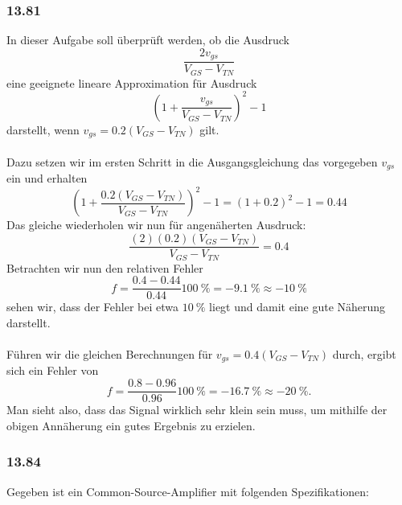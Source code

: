 \documentclass[11pt,a4paper,titlepage]{article}
\begin{document}
\subsubsection*{13.81}
In dieser Aufgabe soll überprüft werden, ob die Ausdruck
\[\frac{2v_{gs}}{V_{GS}-V_{TN}}\] 
eine geeignete lineare Approximation für Ausdruck
\[\left(1 + \frac{v_{gs}}{V_{GS}-V_{TN}}\right)^2-1\]
darstellt, wenn $v_{gs} = 0.2(V_{GS}-V_{TN})$ gilt.\\
\\
Dazu setzen wir im ersten Schritt in die Ausgangsgleichung das vorgegeben $v_{gs}$ ein und erhalten
\[\left(1 + \frac{0.2(V_{GS}-V_{TN})}{V_{GS}-V_{TN}}\right)^2-1 = (1 + 0.2)^2-1 = 0.44\]
Das gleiche wiederholen wir nun für angenäherten Ausdruck:
\[\frac{(2)(0.2)(V_{GS}-V_{TN})}{V_{GS}-V_{TN}} = 0.4\]
Betrachten wir nun den relativen Fehler
\[f = \frac{0.4 - 0.44}{0.44}\SI{100}{\percent} = \SI{-9.1}{\percent} \approx \SI{-10}{\percent}\]
sehen wir, dass der Fehler bei etwa $\SI{10}{\percent}$ liegt und damit eine gute Näherung darstellt.\\
\\
Führen wir die gleichen Berechnungen für $v_{gs} = 0.4(V_{GS}-V_{TN})$ durch, ergibt sich ein Fehler von
\[f = \frac{0.8 - 0.96}{0.96}\SI{100}{\percent} = \SI{-16.7}{\percent} \approx \SI{-20}{\percent}.\]
Man sieht also, dass das Signal wirklich sehr klein sein muss, um mithilfe der obigen Annäherung ein gutes Ergebnis zu erzielen.

\subsubsection*{13.84}
Gegeben ist ein Common-Source-Amplifier mit folgenden Spezifikationen:
\end{document}

